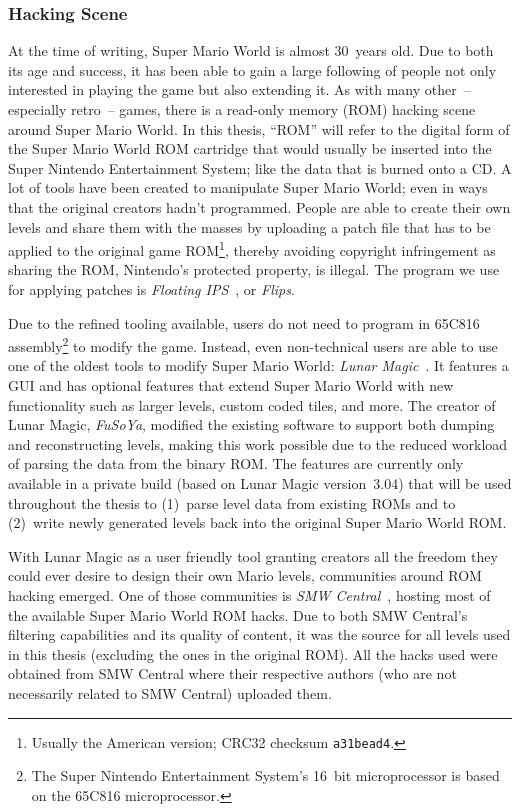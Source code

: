 \subsubsection{Hacking Scene}
\label{sec:hacks}

At the time of writing, Super Mario World is almost 30~years old. Due
to both its age and success, it has been able to gain a large
following of people not only interested in playing the game but also
extending it. As with many other~-- especially retro~-- games, there is
a read-only memory (ROM) hacking scene around Super Mario World. In
this thesis, ``ROM'' will refer to the digital form of the Super Mario
World ROM cartridge that would usually be inserted into the Super
Nintendo Entertainment System; like the data that is burned onto a CD.
A lot of tools have been created to manipulate Super Mario World; even
in ways that the original creators hadn't programmed. People are able
to create their own levels and share them with the masses by uploading
a patch file that has to be applied to the original game
ROM\footnote{Usually the American version; CRC32 checksum
  \texttt{a31bead4}.}, thereby avoiding copyright infringement as
sharing the ROM, Nintendo's protected property, is illegal. The
program we use for applying patches is \emph{Floating
  IPS}~\cite{alcaroAlcaroFlips2019,FloatingIPSFlips}, or \emph{Flips}.

Due to the refined tooling available, users do not need to program in
65C816 assembly\footnote{The Super Nintendo Entertainment System's
  16~bit microprocessor is based on the 65C816 microprocessor.} to
modify the game. Instead, even non-technical users are able to use one
of the oldest tools to modify Super Mario World: \emph{Lunar
  Magic}~\cite{FuSoYaNicheLunar}. It features a GUI and has optional
features that extend Super Mario World with new functionality such as
larger levels, custom coded tiles, and more. The creator of Lunar
Magic, \emph{FuSoYa}, modified the existing software to support both
dumping and reconstructing levels, making this work possible due to
the reduced workload of parsing the data from the binary ROM. The
features are currently only available in a private build (based on
Lunar Magic version~3.04) that will be used throughout the thesis to
(1)~parse level data from existing ROMs and to (2)~write newly
generated levels back into the original Super Mario World ROM.

With Lunar Magic as a user friendly tool granting creators all the
freedom they could ever desire to design their own Mario levels,
communities around ROM hacking emerged. One of those communities is
\emph{SMW Central}~\cite{SMWCentralYour}, hosting most of the
available Super Mario World ROM hacks. Due to both SMW Central's
filtering capabilities and its quality of content, it was the source
for all levels used in this thesis (excluding the ones in the original
ROM). All the hacks used were obtained from SMW Central where their
respective authors (who are not necessarily related to SMW Central)
uploaded them.

